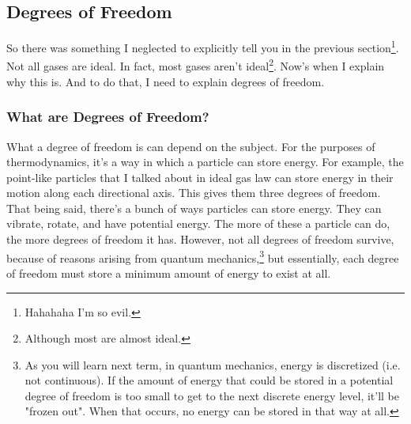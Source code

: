 \subsection{Degrees of Freedom}
So there was something I neglected to explicitly tell you in the previous section\footnote{Hahahaha I'm so evil.}. Not all gases are ideal. In fact, most gases aren't ideal\footnote{Although most are almost ideal.}. Now's when I explain why this is. And to do that, I need to explain degrees of freedom.
\subsubsection{What are Degrees of Freedom?}
What a degree of freedom is can depend on the subject. For the purposes of thermodynamics, it's a way in which a particle can store energy. For example, the point-like particles that I talked about in ideal gas law can store energy in their motion along each directional axis. This gives them three degrees of freedom. That being said, there's a bunch of ways particles can store energy. They can vibrate, rotate, and have potential energy. The more of these a particle can do, the more degrees of freedom it has. However, not all degrees of freedom survive, because of reasons arising from quantum mechanics,\footnote{As you will learn next term, in quantum mechanics, energy is discretized (i.e. not continuous). If the amount of energy that could be stored in a potential degree of freedom is too small to get to the next discrete energy level, it'll be "frozen out". When that occurs, no energy can be stored in that way at all.} but essentially, each degree of freedom must store a minimum amount of energy to exist at all. 
